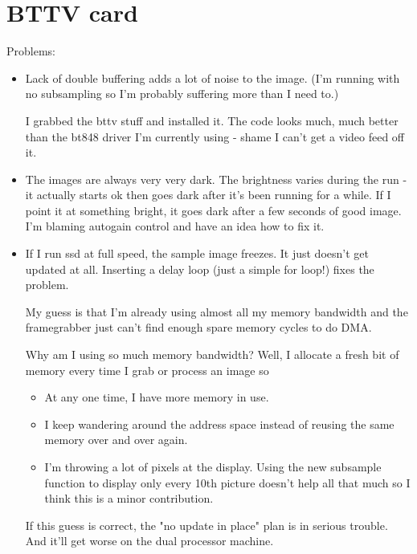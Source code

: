 \section{BTTV card}

Problems:
\begin{itemize}
\item
   Lack of double buffering adds a lot of noise to the image.
   (I'm running with no subsampling so I'm probably suffering more
    than I need to.)

   I grabbed the bttv stuff and installed it.
   The code looks much, much better than the bt848 driver I'm currently
   using - shame I can't get a video feed off it.

\item
   The images are always very very dark.
   The brightness varies during the run - it actually starts ok then goes
   dark after it's been running for a while.  If I point it at something
   bright, it goes dark after a few seconds of good image.
   I'm blaming autogain control and have an idea how to fix it.

\item
If I run ssd at full speed, the sample image freezes.
It just doesn't get updated at all.
Inserting a delay loop (just a simple for loop!) fixes the problem.

My guess is that I'm already using almost all my memory bandwidth
and the framegrabber just can't find enough spare memory cycles
to do DMA.  

Why am I using so much memory bandwidth?  Well, I allocate a fresh 
bit of memory every time I grab or process an image so

\begin{itemize}
\item
   At any one time, I have more memory in use.

\item
   I keep wandering around the address space instead of 
   reusing the same memory over and over again.

\item
   I'm throwing a lot of pixels at the display.
   Using the new subsample function to display only every 10th
   picture doesn't help all that much so I think this is a minor
   contribution.
\end{itemize}

If this guess is correct, the "no update in place" plan is in serious
trouble.  And it'll get worse on the dual processor machine.


\end{itemize}
